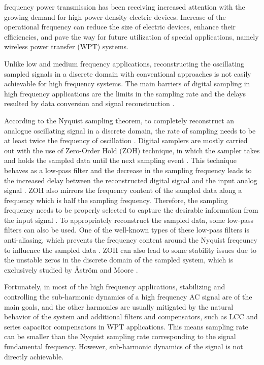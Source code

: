 \documentclass[journal,a4paper,10pt,twoside]{IEEEtran} %
\begin{document}
	 frequency power transmission has been receiving increased attention with the growing demand for high power density electric devices. Increase of the operational frequency can reduce the size of electric devices, enhance their efficiencies, and pave the way for future utilization of special applications, namely wireless power transfer (WPT) systems.
	
	Unlike low and medium frequency applications, reconstructing the oscillating sampled signals in a discrete domain with conventional approaches is not easily achievable for high frequency systems. The main barriers of digital sampling in high frequency applications are the limits in the sampling rate and the delays resulted by data conversion and signal reconstruction \cite{fadali2013digital}.
	
	According to the Nyquist sampling theorem, to completely reconstruct an analogue oscillating signal in a discrete domain, the rate of sampling needs to be at least twice the frequency of oscillation \cite{NYQUIST_1,NYQUIST_2,NYQUIST_3}. Digital samplers are mostly carried out with the use of Zero-Order Hold (ZOH) technique, in which the sampler takes and holds the sampled data until the next sampling event \cite{fadali2013digital,ZOH}. This technique behaves as a low-pass filter and the decrease in the sampling frequency leads to the increased delay between the reconstructed digital signal and the input analog signal \cite{fadali2013digital}. {\color{blue}ZOH also mirrors the frequency content of the sampled data along a frequency which is half the sampling frequency.} Therefore, the sampling frequency needs to be properly selected to capture the desirable information from the input signal \cite{NYQUIST_2,NYQUIST_3,NYQUIST_4}. To appropriately reconstruct the sampled data, some low-pass filters can also be used. One of the well-known types of these low-pass filters is anti-aliasing, which prevents the frequency content around the Nyquist freqeuncy to influence the sampled data \cite{NYQUIST_4,NYQUIST_5,NYQUIST_6}. ZOH can also lead to some stability issues due to the unstable zeros in the discrete domain of the sampled system, which is exclusively studied by {\AA}str{\"o}m and Moore \cite{UNSTABLE_1,UNSTABLE_2}.
	
	Fortunately, in most of the high frequency applications, stabilizing and controlling the sub-harmonic dynamics of a high frequency AC signal are of the main goals, and the other harmonics are usually mitigated by the natural behavior of the system and additional filters and compensators, such as LCC and series capacitor compensators in WPT applications. This means sampling rate can be smaller than the Nyquist sampling rate corresponding to the signal fundamental frequency. {\color{blue}However, sub-harmonic dynamics of the signal is not directly achievable.}
	
\end{document}
